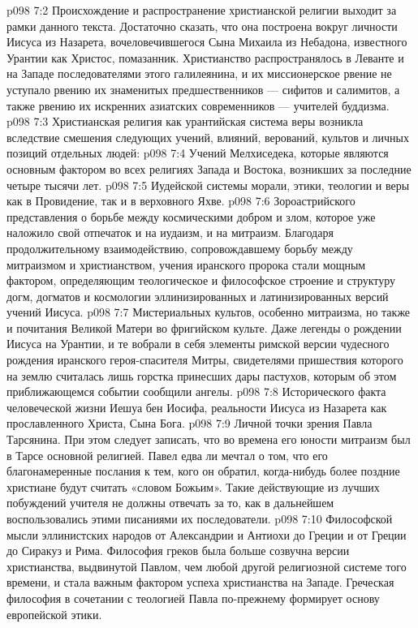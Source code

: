 \vs p098 7:2 Происхождение и распространение христианской религии выходит за рамки данного текста. Достаточно сказать, что она построена вокруг личности Иисуса из Назарета, вочеловечившегося Сына Михаила из Небадона, известного Урантии как Христос, помазанник. Христианство распространялось в Леванте и на Западе последователями этого галилеянина, и их миссионерское рвение не уступало рвению их знаменитых предшественников --- сифитов и салимитов, а также рвению их искренних азиатских современников --- учителей буддизма.
\vs p098 7:3 Христианская религия как урантийская система веры возникла вследствие смешения следующих учений, влияний, верований, культов и личных позиций отдельных людей:
\vs p098 7:4 \bibnobreakspace Учений Мелхиседека, которые являются основным фактором во всех религиях Запада и Востока, возникших за последние четыре тысячи лет.
\vs p098 7:5 \pc {}\bibnobreakspace Иудейской системы морали, этики, теологии и веры как в Провидение, так и в верховного Яхве.
\vs p098 7:6 \pc {}\bibnobreakspace Зороастрийского представления о борьбе между космическими добром и злом, которое уже наложило свой отпечаток и на иудаизм, и на митраизм. Благодаря продолжительному взаимодействию, сопровождавшему борьбу между митраизмом и христианством, учения иранского пророка стали мощным фактором, определяющим теологическое и философское строение и структуру догм, догматов и космологии эллинизированных и латинизированных версий учений Иисуса.
\vs p098 7:7 \pc {}\bibnobreakspace Мистериальных культов, особенно митраизма, но также и почитания Великой Матери во фригийском культе. Даже легенды о рождении Иисуса на Урантии, и те вобрали в себя элементы римской версии чудесного рождения иранского героя\hyp{}спасителя Митры, свидетелями пришествия которого на землю считалась лишь горстка принесших дары пастухов, которым об этом приближающемся событии сообщили ангелы.
\vs p098 7:8 \pc {}\bibnobreakspace Исторического факта человеческой жизни Иешуа бен Иосифа, реальности Иисуса из Назарета как прославленного Христа, Сына Бога.
\vs p098 7:9 \pc {}\bibnobreakspace Личной точки зрения Павла Тарсянина. При этом следует записать, что во времена его юности митраизм был в Тарсе основной религией. Павел едва ли мечтал о том, что его благонамеренные послания к тем, кого он обратил, когда\hyp{}нибудь более поздние христиане будут считать «словом Божьим». Такие действующие из лучших побуждений учителя не должны отвечать за то, как в дальнейшем воспользовались этими писаниями их последователи.
\vs p098 7:10 \pc {}\bibnobreakspace Философской мысли эллинистских народов от Александрии и Антиохи до Греции и от Греции до Сиракуз и Рима. Философия греков была больше созвучна версии христианства, выдвинутой Павлом, чем любой другой религиозной системе того времени, и стала важным фактором успеха христианства на Западе. Греческая философия в сочетании с теологией Павла по\hyp{}прежнему формирует основу европейской этики.
